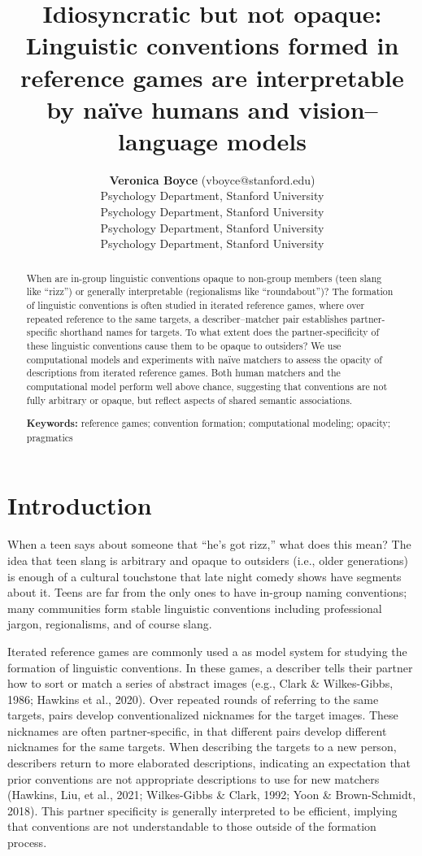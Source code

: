 \documentclass[10pt, letterpaper]{article}
\title{Idiosyncratic but not opaque: Linguistic conventions formed in
reference games are interpretable by naïve humans and vision--language
models}
\author{{\large \bf Veronica Boyce} (vboyce@stanford.edu) \\ Psychology Department, Stanford University \And {\large \bf Ben Prystawski}  \\ Psychology Department, Stanford University \AND {\large \bf Alvin Tan}  \\ Psychology Department, Stanford University \And {\large \bf Michael C. Frank}  \\ Psychology Department, Stanford University}
\begin{document}
\maketitle

\begin{abstract}
When are in-group linguistic conventions opaque to non-group members
(teen slang like ``rizz'') or generally interpretable (regionalisms like
``roundabout'')? The formation of linguistic conventions is often
studied in iterated reference games, where over repeated reference to
the same targets, a describer--matcher pair establishes partner-specific
shorthand names for targets. To what extent does the partner-specificity
of these linguistic conventions cause them to be opaque to outsiders? We
use computational models and experiments with naïve matchers to assess
the opacity of descriptions from iterated reference games. Both human
matchers and the computational model perform well above chance,
suggesting that conventions are not fully arbitrary or opaque, but
reflect aspects of shared semantic associations.

\textbf{Keywords:}
reference games; convention formation; computational modeling; opacity;
pragmatics
\end{abstract}

\section{Introduction}\label{introduction}

When a teen says about someone that ``he's got rizz,'' what does this
mean? The idea that teen slang is arbitrary and opaque to outsiders
(i.e., older generations) is enough of a cultural touchstone that late
night comedy shows have segments about it. Teens are far from the only
ones to have in-group naming conventions; many communities form stable
linguistic conventions including professional jargon, regionalisms, and
of course slang.

Iterated reference games are commonly used a as model system for
studying the formation of linguistic conventions. In these games, a
describer tells their partner how to sort or match a series of abstract
images (e.g., Clark \& Wilkes-Gibbs, 1986; Hawkins et al., 2020). Over
repeated rounds of referring to the same targets, pairs develop
conventionalized nicknames for the target images. These nicknames are
often partner-specific, in that different pairs develop different
nicknames for the same targets. When describing the targets to a new
person, describers return to more elaborated descriptions, indicating an
expectation that prior conventions are not appropriate descriptions to
use for new matchers (Hawkins, Liu, et al., 2021; Wilkes-Gibbs \& Clark,
1992; Yoon \& Brown-Schmidt, 2018). This partner specificity is
generally interpreted to be efficient, implying that conventions are not
understandable to those outside of the formation process.
\end{document}
